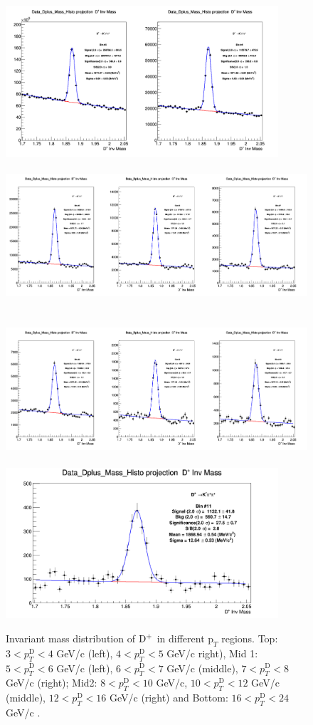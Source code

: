 \begin{figure}[!htp]
\centering
{\includegraphics[width=1\linewidth, height=5.6cm]{figures/DplusPlotsweff/InvMassDistributions_Dplus_Bins3to4.png}}
{\includegraphics[width=1\linewidth, height=5.6cm]{figures/DplusPlotsweff/InvMassDistributions_Dplus_Bins5to7.png}}
{\includegraphics[width=1\linewidth, height=5.6cm]{figures/DplusPlotsweff/InvMassDistributions_Dplus_Bins8to10.png}}
{\includegraphics[width=0.6\linewidth, height=5.6cm]{figures/DplusPlotsweff/InvMassDistributions_Dplus_Bins11to11.png}}

\caption{Invariant mass distribution of ${\rm D^+}$ in different $\text{p}_T$ regions. Top: $3< p_{T}^{\text{D}}< 4$ GeV/c (left), $4< p_{T}^{\text{D}}< 5$ GeV/c right), Mid 1: $5< p_{T}^{\text{D}}< 6$ GeV/c (left), $6 < p_{T}^{\text{D}} < 7$ GeV/c (middle), $7< p_{T}^{\text{D}}< 8$ GeV/c (right); Mid2: $8< p_{T}^{\text{D}}< 10$ GeV/c, $10< p_{T}^{\text{D}}< 12$ GeV/c  (middle), $12 < p_{T}^{\text{D}}< 16$ GeV/c  (right) and Bottom: $16<p_{T}^{\text{D}}< 24$ GeV/c .}
\label{fig:InvMassDp}
\end{figure}

